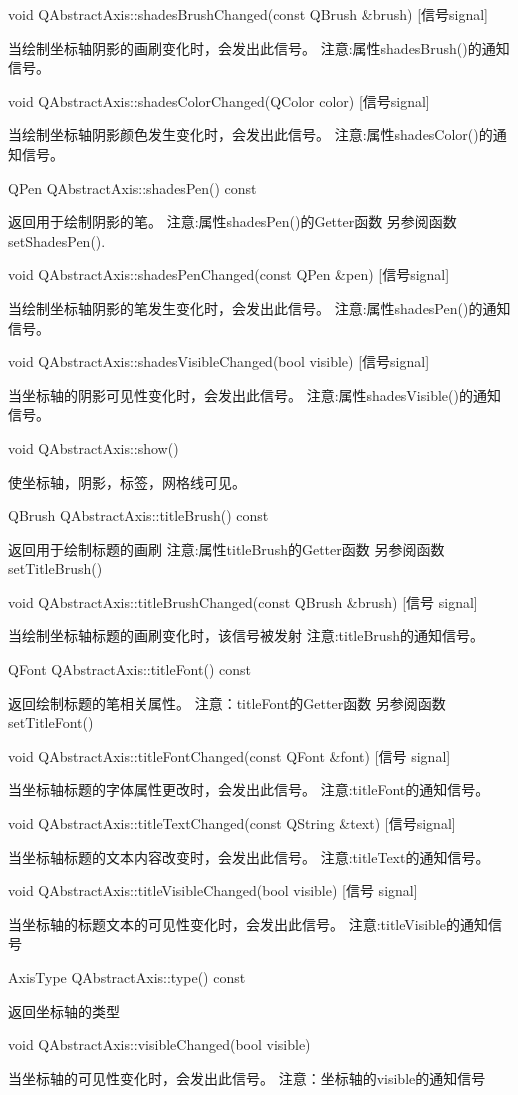 void QAbstractAxis::shadesBrushChanged(const QBrush \&brush) [信号signal] 

当绘制坐标轴阴影的画刷变化时，会发出此信号。 注意:属性shadesBrush()的通知信号。

void QAbstractAxis::shadesColorChanged(QColor color) [信号signal] 

当绘制坐标轴阴影颜色发生变化时，会发出此信号。 注意:属性shadesColor()的通知信号。

QPen QAbstractAxis::shadesPen() const 

返回用于绘制阴影的笔。 注意:属性shadesPen()的Getter函数 另参阅函数setShadesPen().

void QAbstractAxis::shadesPenChanged(const QPen \&pen) [信号signal] 

当绘制坐标轴阴影的笔发生变化时，会发出此信号。 注意:属性shadesPen()的通知信号。

void QAbstractAxis::shadesVisibleChanged(bool visible) [信号signal] 

当坐标轴的阴影可见性变化时，会发出此信号。 注意:属性shadesVisible()的通知信号。

void QAbstractAxis::show() 

使坐标轴，阴影，标签，网格线可见。

QBrush QAbstractAxis::titleBrush() const 

返回用于绘制标题的画刷 注意:属性titleBrush的Getter函数 另参阅函数setTitleBrush()

void QAbstractAxis::titleBrushChanged(const QBrush \&brush) [信号
signal] 

当绘制坐标轴标题的画刷变化时，该信号被发射 注意:titleBrush的通知信号。

QFont QAbstractAxis::titleFont() const 

返回绘制标题的笔相关属性。 注意：titleFont的Getter函数 另参阅函数setTitleFont()

void QAbstractAxis::titleFontChanged(const QFont \&font) [信号 signal]

当坐标轴标题的字体属性更改时，会发出此信号。 注意:titleFont的通知信号。

void QAbstractAxis::titleTextChanged(const QString \&text) [信号signal] 

当坐标轴标题的文本内容改变时，会发出此信号。 注意:titleText的通知信号。

void QAbstractAxis::titleVisibleChanged(bool visible) [信号 signal] 

当坐标轴的标题文本的可见性变化时，会发出此信号。 注意:titleVisible的通知信号

AxisType QAbstractAxis::type() const 

返回坐标轴的类型

void QAbstractAxis::visibleChanged(bool visible) 

当坐标轴的可见性变化时，会发出此信号。 注意：坐标轴的visible的通知信号

